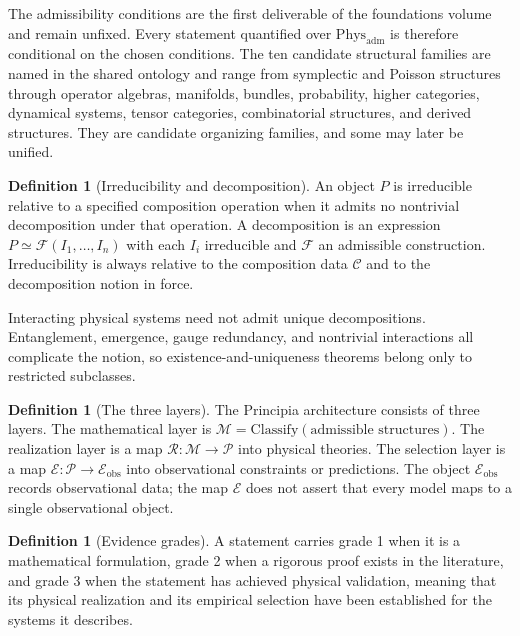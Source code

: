 \documentclass[11pt,letterpaper]{article}
\theoremstyle{definition}
\newtheorem{definition}[theorem]{Definition}
\begin{document}
The admissibility conditions are the first deliverable of the foundations volume and remain unfixed. Every statement quantified over $\mathrm{Phys}_{\mathrm{adm}}$ is therefore conditional on the chosen conditions. The ten candidate structural families are named in the shared ontology and range from symplectic and Poisson structures through operator algebras, manifolds, bundles, probability, higher categories, dynamical systems, tensor categories, combinatorial structures, and derived structures. They are candidate organizing families, and some may later be unified.

\begin{definition}[Irreducibility and decomposition]
\label{def:irreducible}
An object $P$ is irreducible relative to a specified composition operation when it admits no nontrivial decomposition under that operation. A decomposition is an expression $P \simeq \mathcal{F}(I_1, \ldots, I_n)$ with each $I_i$ irreducible and $\mathcal{F}$ an admissible construction. Irreducibility is always relative to the composition data $\mathcal{C}$ and to the decomposition notion in force.
\end{definition}

Interacting physical systems need not admit unique decompositions. Entanglement, emergence, gauge redundancy, and nontrivial interactions all complicate the notion, so existence-and-uniqueness theorems belong only to restricted subclasses.

\begin{definition}[The three layers]
\label{def:layers}
The Principia architecture consists of three layers. The mathematical layer is $\mathcal{M} = \mathrm{Classify}(\text{admissible structures})$. The realization layer is a map $\mathcal{R} : \mathcal{M} \to \mathcal{P}$ into physical theories. The selection layer is a map $\mathcal{E} : \mathcal{P} \to \mathcal{E}_{\mathrm{obs}}$ into observational constraints or predictions. The object $\mathcal{E}_{\mathrm{obs}}$ records observational data; the map $\mathcal{E}$ does not assert that every model maps to a single observational object.
\end{definition}

\begin{definition}[Evidence grades]
\label{def:grades}
A statement carries grade 1 when it is a mathematical formulation, grade 2 when a rigorous proof exists in the literature, and grade 3 when the statement has achieved physical validation, meaning that its physical realization and its empirical selection have been established for the systems it describes.
\end{definition}
\end{document}
